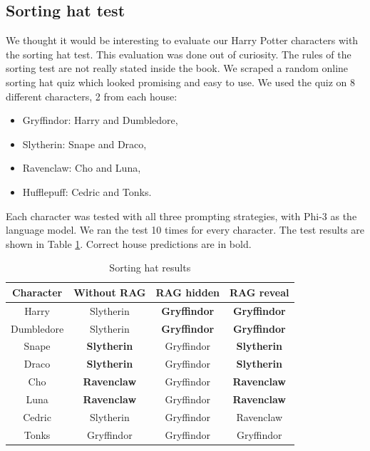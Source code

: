 \documentclass[fleqn,moreauthors,10pt]{ds_report}
\begin{document}
\subsection*{Sorting hat test}
We thought it would be interesting to evaluate our Harry Potter characters with the sorting hat test.
This evaluation was done out of curiosity. The rules of the sorting test are not really stated inside the book.
We scraped a random online sorting hat quiz which looked promising and easy to use.
We used the quiz on 8 different characters, 2 from each house:
\begin{itemize}
	\item Gryffindor: Harry and Dumbledore,
	\item Slytherin: Snape and Draco,
	\item Ravenclaw: Cho and Luna,
	\item Hufflepuff: Cedric and Tonks.
\end{itemize}
Each character was tested with all three prompting strategies, with Phi-3 as the language model.
We ran the test 10 times for every character.
The test results are shown in Table \ref*{tab:sorting_hat_results}. Correct house predictions are in bold.

\begin{table}[hbt]
	\caption{Sorting hat results}
	\centering
	\begin{tabular}{c | c | c | c }
		Character  & Without RAG        & RAG hidden          & RAG reveal          \\ \hline
		Harry      & Slytherin          & \textbf{Gryffindor} & \textbf{Gryffindor} \\
		Dumbledore & Slytherin          & \textbf{Gryffindor} & \textbf{Gryffindor} \\ \hline
		Snape      & \textbf{Slytherin} & Gryffindor          & \textbf{Slytherin}  \\
		Draco      & \textbf{Slytherin} & Gryffindor          & \textbf{Slytherin}  \\ \hline
		Cho        & \textbf{Ravenclaw} & Gryffindor          & \textbf{Ravenclaw}  \\
		Luna       & \textbf{Ravenclaw} & Gryffindor          & \textbf{Ravenclaw}  \\ \hline
		Cedric     & Slytherin          & Gryffindor          & Ravenclaw           \\
		Tonks      & Gryffindor         & Gryffindor          & Gryffindor          \\
	\end{tabular}
	\label{tab:sorting_hat_results}
\end{table}
\end{document}
